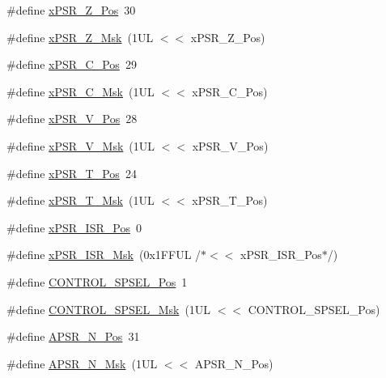 \begin{DoxyCompactItemize}
\item 
\#define \hyperlink{group__CMSIS__CORE_ga5869dd608eea73c80f0567d781d2230b}{x\+P\+S\+R\+\_\+\+Z\+\_\+\+Pos}~30
\item 
\#define \hyperlink{group__CMSIS__CORE_ga907599209fba99f579778e662021c4f2}{x\+P\+S\+R\+\_\+\+Z\+\_\+\+Msk}~(1\+U\+L $<$$<$ x\+P\+S\+R\+\_\+\+Z\+\_\+\+Pos)
\item 
\#define \hyperlink{group__CMSIS__CORE_ga14adb79b91f6634b351a1b57394e2db6}{x\+P\+S\+R\+\_\+\+C\+\_\+\+Pos}~29
\item 
\#define \hyperlink{group__CMSIS__CORE_ga21e2497255d380f956ca0f48d11d0775}{x\+P\+S\+R\+\_\+\+C\+\_\+\+Msk}~(1\+U\+L $<$$<$ x\+P\+S\+R\+\_\+\+C\+\_\+\+Pos)
\item 
\#define \hyperlink{group__CMSIS__CORE_gae0cfbb394490db402623d97e6a979e00}{x\+P\+S\+R\+\_\+\+V\+\_\+\+Pos}~28
\item 
\#define \hyperlink{group__CMSIS__CORE_gab07f94ed3b6ee695f5af719dc27995c2}{x\+P\+S\+R\+\_\+\+V\+\_\+\+Msk}~(1\+U\+L $<$$<$ x\+P\+S\+R\+\_\+\+V\+\_\+\+Pos)
\item 
\#define \hyperlink{group__CMSIS__CORE_ga98d801da9a49cda944f52aeae104dd38}{x\+P\+S\+R\+\_\+\+T\+\_\+\+Pos}~24
\item 
\#define \hyperlink{group__CMSIS__CORE_ga30ae2111816e82d47636a8d4577eb6ee}{x\+P\+S\+R\+\_\+\+T\+\_\+\+Msk}~(1\+U\+L $<$$<$ x\+P\+S\+R\+\_\+\+T\+\_\+\+Pos)
\item 
\#define \hyperlink{group__CMSIS__CORE_ga21bff245fb1aef9683f693d9d7bb2233}{x\+P\+S\+R\+\_\+\+I\+S\+R\+\_\+\+Pos}~0
\item 
\#define \hyperlink{group__CMSIS__CORE_gadf8eed87e0081dfe1ef1c78a0ea91afd}{x\+P\+S\+R\+\_\+\+I\+S\+R\+\_\+\+Msk}~(0x1\+F\+F\+U\+L /$\ast$$<$$<$ x\+P\+S\+R\+\_\+\+I\+S\+R\+\_\+\+Pos$\ast$/)
\item 
\#define \hyperlink{group__CMSIS__CORE_ga07eafc53e609895342c6a530e9d01310}{C\+O\+N\+T\+R\+O\+L\+\_\+\+S\+P\+S\+E\+L\+\_\+\+Pos}~1
\item 
\#define \hyperlink{group__CMSIS__CORE_ga70b29840969b06909da21369b0b05b53}{C\+O\+N\+T\+R\+O\+L\+\_\+\+S\+P\+S\+E\+L\+\_\+\+Msk}~(1\+U\+L $<$$<$ C\+O\+N\+T\+R\+O\+L\+\_\+\+S\+P\+S\+E\+L\+\_\+\+Pos)
\item 
\#define \hyperlink{group__CMSIS__CORE_gac469528d210043c7bd3f12f0e6824766}{A\+P\+S\+R\+\_\+\+N\+\_\+\+Pos}~31
\item 
\#define \hyperlink{group__CMSIS__CORE_gadbc2cf55a026f661b53fadfcf822cef1}{A\+P\+S\+R\+\_\+\+N\+\_\+\+Msk}~(1\+U\+L $<$$<$ A\+P\+S\+R\+\_\+\+N\+\_\+\+Pos)

\end{DoxyCompactItemize}
